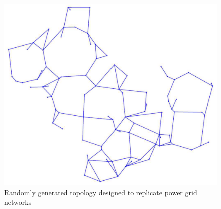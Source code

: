 
\begin{figure}
    \centering
    \includegraphics[width=0.5\linewidth]{images/lit_review_top.png}
    \caption{Randomly generated topology designed to replicate power grid networks \cite{random_power_grid_topo}}
    \label{fig:enter-label}
\end{figure}

